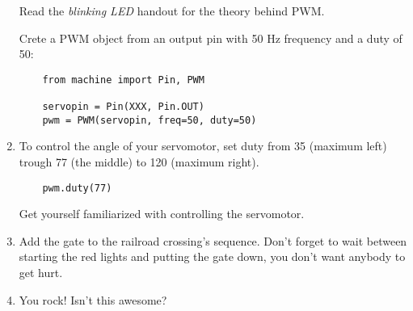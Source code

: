 \documentclass{../tutorial}
\begin{document}
\begin{enumerate}
    Read the \emph{blinking LED} handout for the theory behind PWM.

    Crete a PWM object from an output pin
    with 50 Hz frequency and a duty of 50:

    \begin{lstlisting}
    from machine import Pin, PWM

    servopin = Pin(XXX, Pin.OUT)
    pwm = PWM(servopin, freq=50, duty=50)
    \end{lstlisting}

\item
    To control the angle of your servomotor,
    set duty from 35 (maximum left) trough 77 (the middle) to 120 (maximum right).

    \begin{lstlisting}
    pwm.duty(77)
    \end{lstlisting}

    Get yourself familiarized with controlling the servomotor.

\item
    Add the gate to the railroad crossing's sequence.
    Don't forget to wait between starting the red lights and putting the gate down,
    you don't want anybody to get hurt.

\item
    You rock! Isn't this awesome?

\end{enumerate}
\end{document}
